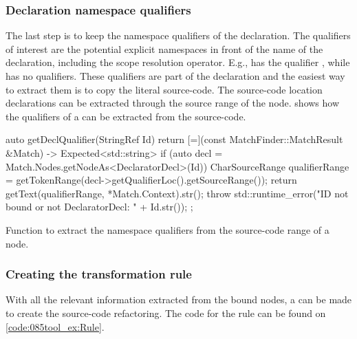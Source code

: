 \subsubsection*{Declaration namespace qualifiers}

The last step is to keep the namespace qualifiers of the declaration. The qualifiers of interest are the potential explicit namespaces in front of the name of the declaration, including the scope resolution operator. E.g.,  has the qualifier , while  has no qualifiers.
These qualifiers are part of the declaration and the easiest way to extract them is to copy the literal source-code. The source-code location declarations can be extracted through the source range of the node.  shows how the qualifiers of a  can be extracted from the source-code.

\begin{listing}[H]
    \begin{cppcode}
auto getDeclQualifier(StringRef Id) {
    return [=](const MatchFinder::MatchResult &Match) -> Expected<std::string> {
        if (auto decl = Match.Nodes.getNodeAs<DeclaratorDecl>(Id)) {
            CharSourceRange qualifierRange = getTokenRange(decl->getQualifierLoc().getSourceRange());
            return getText(qualifierRange, *Match.Context).str();
        }
        throw std::runtime_error("ID not bound or not DeclaratorDecl: " + Id.str());
    };
}
    \end{cppcode}
    \caption{Function to extract the namespace qualifiers from the source-code range of a  node.}
    \label{code:085tool_ex:DeclaratorQualif}
\end{listing}

\subsubsection*{Creating the transformation rule}

With all the relevant information extracted from the bound nodes, a  can be made to create the source-code refactoring. The code for the rule can be found on \cref{code:085tool_ex:Rule}.

